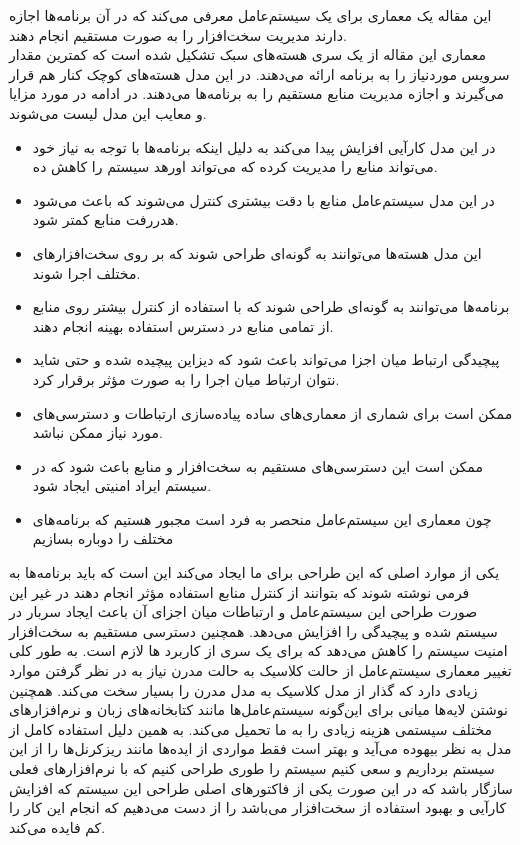 \documentclass[a4paper, 12pt]{article}
\title{\lr{Exokernel: An Operating System Architecture for
Application-Level Resource Management}}
\author{حسین افکار}
\begin{document}
\maketitle
این مقاله یک معماری برای یک سیستم‌عامل معرفی می‌کند که در آن برنامه‌ها اجازه دارند مدیریت سخت‌افزار
را به صورت مستقیم انجام دهند. \\
معماری این مقاله از یک سری هسته‌های سبک تشکیل شده است که کمترین مقدار سرویس مورد‌نیاز
را به برنامه ارائه می‌دهند.
در این مدل هسته‌های کوچک کنار هم قرار می‌گیرند و اجازه مدیریت منابع مستقیم را به برنامه‌ها می‌دهند.
در ادامه در مورد مزایا و معایب این مدل لیست می‌شوند.
\begin{itemize}
    \item در این مدل کارآیی افزایش پیدا می‌کند به دلیل اینکه برنامه‌ها با توجه به نیاز خود
    می‌تواند منابع را مدیریت کرده که می‌تواند اورهد سیستم را کاهش ده.
    \item در این مدل سیستم‌عامل منابع با دقت بیشتری کنترل می‌شوند که باعث می‌شود هدررفت 
    منابع کمتر شود.
    \item این مدل هسته‌ها می‌توانند به گونه‌ای طراحی شوند که بر روی سخت‌افزار‌های مختلف اجرا
    شوند.
    \item برنامه‌ها می‌توانند به گونه‌ای طراحی شوند که با استفاده از کنترل بیشتر روی منابع
    از تمامی منابع در دسترس استفاده بهینه انجام دهند.
    \item پیچیدگی ارتباط میان اجزا می‌تواند باعث شود که دیزاین پیچیده شده
    و حتی شاید نتوان ارتباط میان اجرا را به صورت مؤثر برقرار کرد.
    \item ممکن است برای شماری از معماری‌های ساده پیاده‌سازی ارتباطات و دسترسی‌های
    مورد نیاز ممکن نباشد.
    \item ممکن است این دسترسی‌های مستقیم به سخت‌افزار و منابع باعث شود که در سیستم
    ایراد امنیتی ایجاد شود.
    \item چون معماری این سیستم‌عامل منحصر به فرد است مجبور هستیم که برنامه‌های مختلف را
    دوباره بسازیم
\end{itemize}

یکی از موارد اصلی که این طراحی برای ما ایجاد می‌کند این است که باید برنامه‌ها به فرمی نوشته شوند
که بتوانند از کنترل منابع استفاده مؤثر انجام دهند در غیر این صورت طراحی این سیستم‌عامل
و ارتباطات میان اجزای آن باعث ایجاد سربار در سیستم شده و پیچیدگی را افزایش می‌دهد.
همچنین دسترسی مستقیم به سخت‌افزار امنیت سیستم را کاهش می‌دهد که برای یک سری از کاربرد
ها لازم است.
به طور کلی تغییر معماری سیستم‌عامل از حالت کلاسیک به حالت مدرن نیاز به در نظر گرفتن موارد زیادی
دارد که گذار از مدل کلاسیک به مدل مدرن را بسیار سخت می‌کند.
همچنین نوشتن لایه‌ها میانی برای این‌گونه سیستم‌عامل‌ها مانند کتابخانه‌های
زبان
و نرم‌افزار‌های مختلف سیستمی هزینه‌ زیادی را به ما تحمیل می‌کند.
به همین دلیل استفاده کامل از مدل به نظر بیهوده می‌آید و بهتر است فقط مواردی از ایده‌ها مانند
ریزکرنل‌ها را از این سیستم برداریم و سعی کنیم سیستم را طوری طراحی کنیم که با نرم‌افزار‌های فعلی سازگار باشد
که در این صورت یکی از فاکتور‌های اصلی طراحی این سیستم که افزایش کارآیی و بهبود استفاده از سخت‌افزار می‌باشد
را از دست می‌دهیم که انجام این کار را کم فایده می‌کند.

\end{document}
